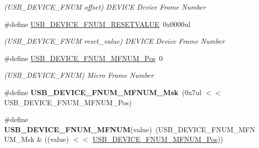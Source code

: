 \begin{DoxyCompactItemize}
\begin{DoxyCompactList}\small\item\em (U\+S\+B\+\_\+\+D\+E\+V\+I\+C\+E\+\_\+\+F\+N\+U\+M offset) D\+E\+V\+I\+C\+E Device Frame Number \end{DoxyCompactList}\item 
\hypertarget{group___s_a_m_l21___u_s_b_ga9d1519b7871620f47daa5eb8495813ad}{}\#define \hyperlink{group___s_a_m_l21___u_s_b_ga9d1519b7871620f47daa5eb8495813ad}{U\+S\+B\+\_\+\+D\+E\+V\+I\+C\+E\+\_\+\+F\+N\+U\+M\+\_\+\+R\+E\+S\+E\+T\+V\+A\+L\+U\+E}~0x0000ul\label{group___s_a_m_l21___u_s_b_ga9d1519b7871620f47daa5eb8495813ad}

\begin{DoxyCompactList}\small\item\em (U\+S\+B\+\_\+\+D\+E\+V\+I\+C\+E\+\_\+\+F\+N\+U\+M reset\+\_\+value) D\+E\+V\+I\+C\+E Device Frame Number \end{DoxyCompactList}\item 
\hypertarget{group___s_a_m_l21___u_s_b_gaf97acec612af7f6fd13b6a72cd73c3d5}{}\#define \hyperlink{group___s_a_m_l21___u_s_b_gaf97acec612af7f6fd13b6a72cd73c3d5}{U\+S\+B\+\_\+\+D\+E\+V\+I\+C\+E\+\_\+\+F\+N\+U\+M\+\_\+\+M\+F\+N\+U\+M\+\_\+\+Pos}~0\label{group___s_a_m_l21___u_s_b_gaf97acec612af7f6fd13b6a72cd73c3d5}

\begin{DoxyCompactList}\small\item\em (U\+S\+B\+\_\+\+D\+E\+V\+I\+C\+E\+\_\+\+F\+N\+U\+M) Micro Frame Number \end{DoxyCompactList}\item 
\hypertarget{group___s_a_m_l21___u_s_b_gab7807c69c8d6f504977d03aa278a569a}{}\#define {\bfseries U\+S\+B\+\_\+\+D\+E\+V\+I\+C\+E\+\_\+\+F\+N\+U\+M\+\_\+\+M\+F\+N\+U\+M\+\_\+\+Msk}~(0x7ul $<$$<$ U\+S\+B\+\_\+\+D\+E\+V\+I\+C\+E\+\_\+\+F\+N\+U\+M\+\_\+\+M\+F\+N\+U\+M\+\_\+\+Pos)\label{group___s_a_m_l21___u_s_b_gab7807c69c8d6f504977d03aa278a569a}

\item 
\hypertarget{group___s_a_m_l21___u_s_b_ga09b34cbf19e0f78d280e933b67a81002}{}\#define {\bfseries U\+S\+B\+\_\+\+D\+E\+V\+I\+C\+E\+\_\+\+F\+N\+U\+M\+\_\+\+M\+F\+N\+U\+M}(value)~(U\+S\+B\+\_\+\+D\+E\+V\+I\+C\+E\+\_\+\+F\+N\+U\+M\+\_\+\+M\+F\+N\+U\+M\+\_\+\+Msk \& ((value) $<$$<$ \hyperlink{group___s_a_m_l21___u_s_b_gaf97acec612af7f6fd13b6a72cd73c3d5}{U\+S\+B\+\_\+\+D\+E\+V\+I\+C\+E\+\_\+\+F\+N\+U\+M\+\_\+\+M\+F\+N\+U\+M\+\_\+\+Pos}))\label{group___s_a_m_l21___u_s_b_ga09b34cbf19e0f78d280e933b67a81002}


\end{DoxyCompactItemize}
